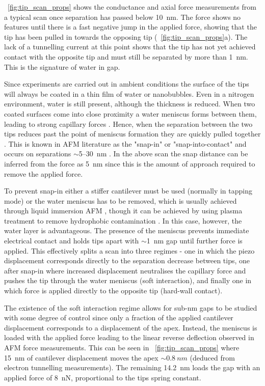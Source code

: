 \documentclass[a4paper]{article}
\begin{document}
\figurename~\ref{fig:tip_scan_props} shows the conductance and axial force measurements from a typical scan once separation has passed below \SI{10}{nm}. The force shows no features until there is a fast negative jump in the applied force, showing that the tip has been pulled in towards the opposing tip (\figurename~\ref{fig:tip_scan_props}a). The lack of a tunnelling current at this point shows that the tip has not yet achieved contact with the opposite tip and must still be separated by more than \SI{1}{nm}. This is the signature of water in gap.

Since experiments are carried out in ambient conditions the surface of the tips will always be coated in a thin film of water or nanobubbles. Even in a nitrogen environment, water is still present, although the thickness is reduced. When two coated surfaces come into close proximity a water meniscus forms between them, leading to strong capillary forces \cite{gan2009atomic}. Hence, when the separation between the two tips reduces past the point of meniscus formation they are quickly pulled together \cite{holmberg2013}. This is known in AFM literature as the "snap-in" or "snap-into-contact" and occurs on separations $\sim$5--\SI{30}{nm} \cite{holmberg2003, song2014}. In the above scan the snap distance can be inferred from the force as \SI{5}{nm} since this is the amount of approach required to remove the applied force.

To prevent snap-in either a stiffer cantilever must be used (normally in tapping mode) \cite{zhong1993fractured} or the water meniscus has to be removed, which is usually achieved through liquid immersion AFM \cite{hansma1994tapping, putman1994tapping, song2014}, though it can be achieved by using plasma treatment to remove hydrophobic contamination \cite{song2014}. In this case, however, the water layer is advantageous. The presence of the meniscus prevents immediate electrical contact and holds tips apart with $\sim$\SI{1}{nm} gap until further force is applied. This effectively splits a scan into three regimes - one in which the piezo displacement corresponds directly to the separation decrease between tips, one after snap-in where increased displacement neutralises the capillary force and pushes the tip through the water meniscus (soft interaction), and finally one in which force is applied directly to the opposite tip (hard-wall contact).

The existence of the soft interaction regime allows for sub-nm gaps to be studied with some degree of control since only a fraction of the applied cantilever displacement corresponds to a displacement of the apex. Instead, the meniscus is loaded with the applied force leading to the linear reverse deflection observed in AFM force measurements. This can be seen in \figurename~\ref{fig:tip_scan_props} where \SI{15}{nm} of cantilever displacement moves the apex $\sim\SI{0.8}{nm}$ (deduced from electron tunnelling measurements). The remaining \SI{14.2}{nm} loads the gap with an applied force of \SI{8}{nN}, proportional to the tips spring constant.
\end{document}
